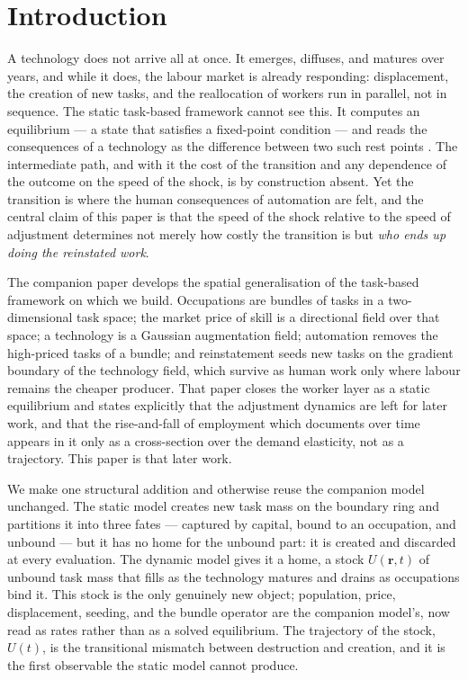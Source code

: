 \documentclass[12pt, a4paper]{article}
\newcommand{\rr}{\mathbf{r}}
\begin{document}
\section{Introduction}
\label{sec:intro}

A technology does not arrive all at once. It emerges, diffuses, and
matures over years, and while it does, the labour market is already
responding: displacement, the creation of new tasks, and the
reallocation of workers run in parallel, not in sequence. The static
task-based framework cannot see this. It computes an equilibrium ---
a state that satisfies a fixed-point condition --- and reads the
consequences of a technology as the difference between two such rest
points \parencite{acemoglu2018race, acemoglu2019automation}. The
intermediate path, and with it the cost of the transition and any
dependence of the outcome on the speed of the shock, is by construction
absent. Yet the transition is where the human consequences of automation
are felt, and the central claim of this paper is that the speed of the
shock relative to the speed of adjustment determines not merely how
costly the transition is but \emph{who ends up doing the reinstated
work}.

The companion paper \parencite{storck2026fields} develops the spatial
generalisation of the task-based framework on which we build. Occupations
are bundles of tasks in a two-dimensional task space; the market price of
skill is a directional field over that space; a technology is a Gaussian
augmentation field; automation removes the high-priced tasks of a bundle;
and reinstatement seeds new tasks on the gradient boundary of the
technology field, which survive as human work only where labour remains
the cheaper producer. That paper closes the worker layer as a static
equilibrium and states explicitly that the adjustment dynamics are left
for later work, and that the rise-and-fall of employment which
\textcite{bessen2019demand} documents over time appears in it only as a
cross-section over the demand elasticity, not as a trajectory. This paper
is that later work.

We make one structural addition and otherwise reuse the companion model
unchanged. The static model creates new task mass on the boundary ring
and partitions it into three fates --- captured by capital, bound to an
occupation, and unbound --- but it has no home for the unbound part: it is
created and discarded at every evaluation. The dynamic model gives it a
home, a stock $U(\rr,t)$ of unbound task mass that fills as the
technology matures and drains as occupations bind it. This stock is the
only genuinely new object; population, price, displacement, seeding, and
the bundle operator are the companion model's, now read as rates rather
than as a solved equilibrium. The trajectory of the stock, $U(t)$, is the
transitional mismatch between destruction and creation, and it is the
first observable the static model cannot produce.
\end{document}
